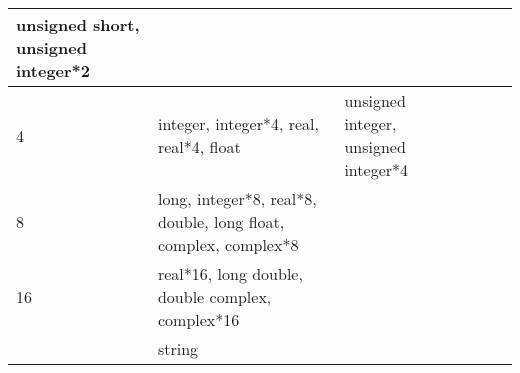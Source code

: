 {\begin{longtable}{llllll}
{\begin{minipage}[t]{1.526in}
{\small unsigned short, unsigned integer*2}\end{minipage}}\\
\hline
\multicolumn{1}{p{0.051in}|}{\begin{minipage}[t]{0.051in}\centering
{\small 4}\end{minipage}} & \multicolumn{1}{p{0.051in}|}{\begin{minipage}[t]{0.051in}\centering
{\small integer, integer*4, real, real*4, float}\end{minipage}} & \multicolumn{1}{p{0.051in}|}{\begin{minipage}[t]{0.051in}\raggedright
{\small unsigned integer, unsigned integer*4}\end{minipage}}\\
\hline
\multicolumn{1}{|p{0.287in}|}{\begin{minipage}[t]{0.287in}\centering
{\small 8}\end{minipage}} & \multicolumn{1}{p{2.534in}|}{\begin{minipage}[t]{2.534in}\centering
{\small long, integer*8, real*8, double, long float, complex, complex*8}\end{minipage}} & \multicolumn{4}{p{1.680in}|}{\begin{minipage}[t]{1.680in}\raggedright
\end{minipage}}\\
\hline
\multicolumn{1}{p{0.051in}|}{\begin{minipage}[t]{0.051in}\centering
{\small 16}\end{minipage}} & \multicolumn{1}{p{0.051in}|}{\begin{minipage}[t]{0.051in}\centering
{\small real*16, long double, double complex, complex*16}\end{minipage}} & \multicolumn{1}{p{0.051in}|}{\begin{minipage}[t]{0.051in}\centering
\end{minipage}}\\
\hline
\multicolumn{1}{|p{0.287in}|}{\begin{minipage}[t]{0.287in}\centering
\end{minipage}} & \multicolumn{1}{p{2.534in}|}{\begin{minipage}[t]{2.534in}\centering
{\small string}\end{minipage}} & \multicolumn{4}{p{1.680in}|}{\begin{minipage}[t]{1.680in}\raggedright
\end{minipage}}\\
\hline
\end{longtable}
\label{HToc182553462}}

